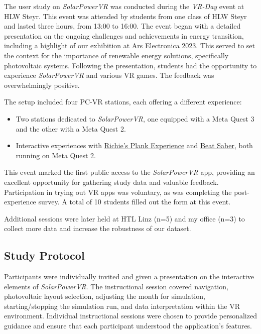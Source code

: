 \documentclass[draft, final]{vutinfth} %
\begin{document}
The user study on \textit{SolarPowerVR} was conducted during the \textit{VR-Day} event at HLW Steyr. This event was attended by students from one class of HLW Steyr and lasted three hours, from 13:00 to 16:00. The event began with a detailed presentation on the ongoing challenges and achievements in energy transition, including a highlight of our exhibition at Ars Electronica 2023. This served to set the context for the importance of renewable energy solutions, specifically photovoltaic systems. Following the presentation, students had the opportunity to experience \textit{SolarPowerVR} and various VR games. The feedback was overwhelmingly positive.

The setup included four PC-VR stations, each offering a different experience:
\begin{itemize}
    \item Two stations dedicated to \textit{SolarPowerVR}, one equipped with a Meta Quest 3 and the other with a Meta Quest 2.
    \item Interactive experiences with \hyperlink{https://store.steampowered.com/app/517160/Richies_Plank_Experience/}{Richie's Plank Experience} and \hyperlink{https://store.steampowered.com/app/620980/Beat_Saber/}{Beat Saber}, both running on Meta Quest 2.
\end{itemize}

This event marked the first public access to the \textit{SolarPowerVR} app, providing an excellent opportunity for gathering study data and valuable feedback. Participation in trying out VR apps was voluntary, as was completing the post-experience survey. A total of 10 students filled out the form at this event.

Additional sessions were later held at HTL Linz (n=5) and my office (n=3) to collect more data and increase the robustness of our dataset.

\subsection{Study Protocol}

Participants were individually invited and given a presentation on the interactive elements of \textit{SolarPowerVR}. The instructional session covered navigation, photovoltaic layout selection, adjusting the month for simulation, starting/stopping the simulation run, and data interpretation within the VR environment. Individual instructional sessions were chosen to provide personalized guidance and ensure that each participant understood the application's features.
\end{document}

